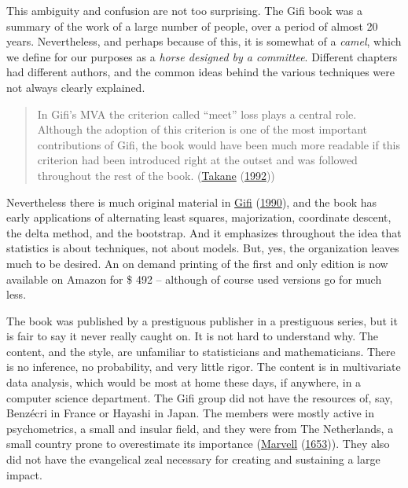 \documentclass[
  12pt,
]{book}
\begin{document}
This ambiguity and confusion are not too surprising. The Gifi book was a summary of the work of a large number of people, over a period of almost 20 years. Nevertheless, and perhaps because of this, it is somewhat of a \emph{camel}, which we define for our purposes as a \emph{horse designed by a committee}. Different chapters had different authors, and the common ideas behind the various techniques were not always clearly explained.

\begin{quote}
In Gifi's MVA the criterion called ``meet'' loss plays a central role. Although the
adoption of this criterion is one of the most important contributions of Gifi, the
book would have been much more readable if this criterion had been introduced right
at the outset and was followed throughout the rest of the book. (\protect\hyperlink{ref-takane_92}{Takane} (\protect\hyperlink{ref-takane_92}{1992}))
\end{quote}

Nevertheless there is much original material in \protect\hyperlink{ref-gifi_B_90}{Gifi} (\protect\hyperlink{ref-gifi_B_90}{1990}), and the book has early applications of alternating least squares, majorization, coordinate descent, the delta method, and the bootstrap. And it emphasizes throughout the idea that statistics is about techniques, not about models. But, yes, the organization leaves much to be desired. An on demand printing of the first and only edition is now available on Amazon for \$ 492 -- although of course used versions go for much less.

The book was published by a prestiguous publisher in a prestiguous series, but it is fair to say it never really caught on. It is not hard to understand why. The content, and the style, are unfamiliar to statisticians and mathematicians. There is no inference, no probability, and very little rigor. The content is in multivariate data analysis, which would be most at home these days, if anywhere, in a computer science department. The Gifi group did not have the resources of, say, Benzécri in France or Hayashi in Japan. The members were mostly active in psychometrics, a small and insular field, and they were from The Netherlands, a small country prone to overestimate its importance (\protect\hyperlink{ref-marvell_53}{Marvell} (\protect\hyperlink{ref-marvell_53}{1653})). They also did not have the evangelical zeal necessary for creating and sustaining a large impact.
\end{document}
